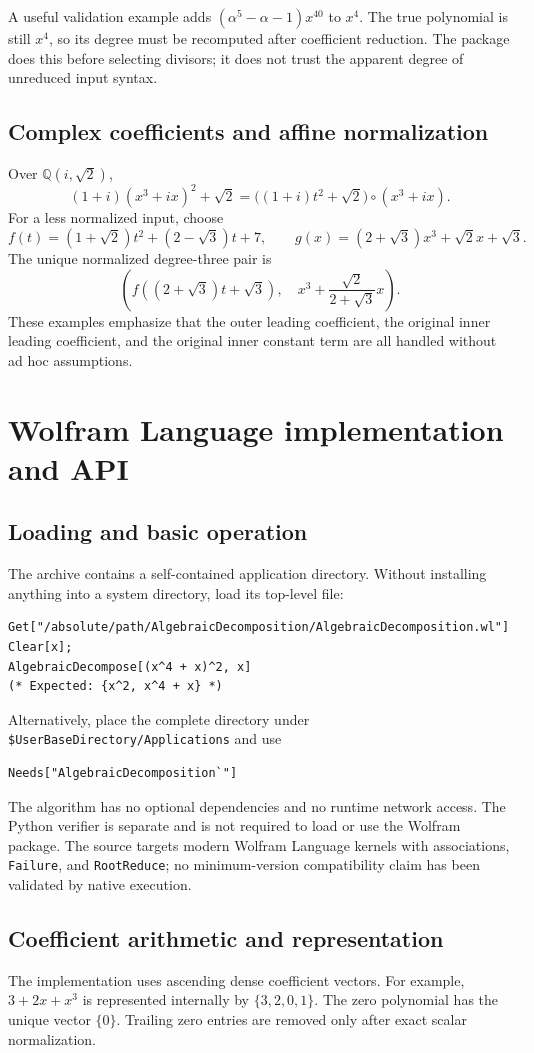 \documentclass[11pt,a4paper]{article}
\numberwithin{equation}{section}
\theoremstyle{definition}
\theoremstyle{remark}
\newcommand{\Q}{\mathbb{Q}}
\newcommand{\code}[1]{\texttt{#1}}
\begin{document}
A useful validation example adds $(\alpha^5-\alpha-1)x^{40}$ to $x^4$.
The true polynomial is still $x^4$, so its degree must be recomputed after
coefficient reduction. The package does this before selecting divisors; it
does not trust the apparent degree of unreduced input syntax.

\subsection{Complex coefficients and affine normalization}
Over $\Q(i,\sqrt2)$,
\[
 (1+i)(x^3+ix)^2+\sqrt2
 =\bigl((1+i)t^2+\sqrt2\bigr)\circ(x^3+ix).
\]
For a less normalized input, choose
\[
 f(t)=(1+\sqrt2)t^2+(2-\sqrt3)t+7,\qquad
 g(x)=(2+\sqrt3)x^3+\sqrt2 x+\sqrt3.
\]
The unique normalized degree-three pair is
\[
 \left(f((2+\sqrt3)t+\sqrt3),\quad
           x^3+\frac{\sqrt2}{2+\sqrt3}x\right).
\]
These examples emphasize that the outer leading coefficient, the original
inner leading coefficient, and the original inner constant term are all
handled without ad hoc assumptions.

\section{Wolfram Language implementation and API}
\label{sec:implementation}
\subsection{Loading and basic operation}
The archive contains a self-contained application directory. Without
installing anything into a system directory, load its top-level file:
\begin{lstlisting}
Get["/absolute/path/AlgebraicDecomposition/AlgebraicDecomposition.wl"]
Clear[x];
AlgebraicDecompose[(x^4 + x)^2, x]
(* Expected: {x^2, x^4 + x} *)
\end{lstlisting}
Alternatively, place the complete directory under
\code{\$UserBaseDirectory/Applications} and use
\begin{lstlisting}
Needs["AlgebraicDecomposition`"]
\end{lstlisting}
The algorithm has no optional dependencies and no runtime network access.
The Python verifier is separate and is not required to load or use the Wolfram
package. The source targets modern Wolfram Language kernels with associations,
\code{Failure}, and \code{RootReduce}; no minimum-version compatibility claim
has been validated by native execution.

\subsection{Coefficient arithmetic and representation}
The implementation uses ascending dense coefficient vectors. For example,
$3+2x+x^3$ is represented internally by $\{3,2,0,1\}$. The zero polynomial
has the unique vector $\{0\}$. Trailing zero entries are removed only after
exact scalar normalization.
\end{document}

